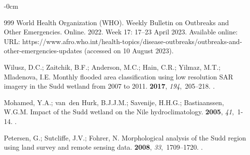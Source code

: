 \documentclass[analytics,article,accept,pdftex,moreauthors]{Definitions/mdpi}
\begin{document}
\begin{adjustwidth}{-\extralength}{0cm}
\begin{thebibliography}{999}
{World Health Organization (WHO)}.
\newblock Weekly Bulletin on Outbreaks and Other Emergencies.
\newblock Online.  2022. Week 17: 17--23 April 2023.
\newblock Available online: URL: https://www.afro.who.int/health-topics/disease-outbreaks/outbreaks-and-other-emergencies-updates (accessed on 10 August 2023). %

Wilusz, D.C.; Zaitchik, B.F.; Anderson, M.C.; Hain, C.R.; Yilmaz, M.T.;
  Mladenova, I.E.
\newblock Monthly flooded area classification using low resolution SAR imagery
  in the Sudd wetland from 2007 to 2011.
 {\bf 2017}, {\em 194},~205--218.
.

Mohamed, Y.A.; van~den Hurk, B.J.J.M.; Savenije, H.H.G.; Bastiaanssen, W.G.M.
\newblock Impact of the Sudd wetland on the Nile hydroclimatology.
 {\bf 2005}, {\em 41},~1-14. %
.

Petersen, G.; Sutcliffe, J.V.; Fohrer, N.
\newblock Morphological analysis of the Sudd region using land survey and
  remote sensing data.
 {\bf 2008}, {\em
  33},~1709--1720.
.

\end{thebibliography}

\PublishersNote{}
\end{adjustwidth}
\end{document}
